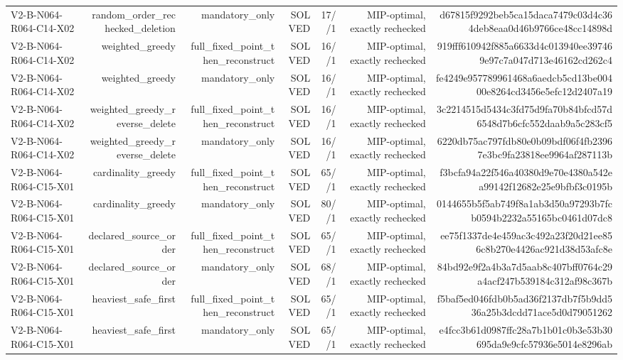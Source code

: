 {\begin{longtable}{lrrrrrr}
V2-B-N064-R064-C14-X02 & random\_order\_rechecked\_deletion & mandatory\_only & SOLVED & 17//1 & MIP-optimal, exactly rechecked & d67815f9292beb5ca15daca7479c03d4c364deb8eaa0d46b9766ce48cc14898d \\
V2-B-N064-R064-C14-X02 & weighted\_greedy & full\_fixed\_point\_then\_reconstruct & SOLVED & 16//1 & MIP-optimal, exactly rechecked & 919fff610942f885a6633d4c013940ee397469e97c7a047d713e46162cd262c4 \\
V2-B-N064-R064-C14-X02 & weighted\_greedy & mandatory\_only & SOLVED & 16//1 & MIP-optimal, exactly rechecked & fe4249e957789961468a6aedcb5cd13be00400e8264cd3456e5efc12d2407a19 \\
V2-B-N064-R064-C14-X02 & weighted\_greedy\_reverse\_delete & full\_fixed\_point\_then\_reconstruct & SOLVED & 16//1 & MIP-optimal, exactly rechecked & 3c2214515d5434c3fd75d9fa70b84bfcd57d6548d7b6cfc552daab9a5c283cf5 \\
V2-B-N064-R064-C14-X02 & weighted\_greedy\_reverse\_delete & mandatory\_only & SOLVED & 16//1 & MIP-optimal, exactly rechecked & 6220db75ac797fdb80e0b09bdf06f4fb23967e3bc9fa23818ee9964af287113b \\
V2-B-N064-R064-C15-X01 & cardinality\_greedy & full\_fixed\_point\_then\_reconstruct & SOLVED & 65//1 & MIP-optimal, exactly rechecked & f3bcfa94a22f546a40380d9e70e4380a542ea99142f12682e25e9bfbf3c0195b \\
V2-B-N064-R064-C15-X01 & cardinality\_greedy & mandatory\_only & SOLVED & 80//1 & MIP-optimal, exactly rechecked & 0144655b5f5ab749f8a1ab3d50a97293b7fcb0594b2232a55165bc0461d07dc8 \\
V2-B-N064-R064-C15-X01 & declared\_source\_order & full\_fixed\_point\_then\_reconstruct & SOLVED & 65//1 & MIP-optimal, exactly rechecked & ee75f1337de4e459ac3c492a23f20d21ee856c8b270e4426ac921d38d53afc8e \\
V2-B-N064-R064-C15-X01 & declared\_source\_order & mandatory\_only & SOLVED & 68//1 & MIP-optimal, exactly rechecked & 84bd92e9f2a4b3a7d5aab8c407bff0764c29a4acf247b539184c312af98c367b \\
V2-B-N064-R064-C15-X01 & heaviest\_safe\_first & full\_fixed\_point\_then\_reconstruct & SOLVED & 65//1 & MIP-optimal, exactly rechecked & f5baf5ed046fdb0b5ad36f2137db7f5b9dd536a25b3dcdd71ace5d0d79051262 \\
V2-B-N064-R064-C15-X01 & heaviest\_safe\_first & mandatory\_only & SOLVED & 65//1 & MIP-optimal, exactly rechecked & e4fcc3b61d0987ffc28a7b1b01c0b3e53b30695da9e9cfc57936e5014e8296ab \\

\end{longtable}}
